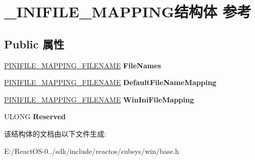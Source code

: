 \hypertarget{struct___i_n_i_f_i_l_e___m_a_p_p_i_n_g}{}\section{\+\_\+\+I\+N\+I\+F\+I\+L\+E\+\_\+\+M\+A\+P\+P\+I\+N\+G结构体 参考}
\label{struct___i_n_i_f_i_l_e___m_a_p_p_i_n_g}
\subsection*{Public 属性}
\begin{DoxyCompactItemize}
\item 
\mbox{\label{struct___i_n_i_f_i_l_e___m_a_p_p_i_n_g_a164a8a2c4169fd108c1e3c3f79a61966}} 
\hyperlink{struct___i_n_i_f_i_l_e___m_a_p_p_i_n_g___f_i_l_e_n_a_m_e}{P\+I\+N\+I\+F\+I\+L\+E\+\_\+\+M\+A\+P\+P\+I\+N\+G\+\_\+\+F\+I\+L\+E\+N\+A\+ME} {\bfseries File\+Names}
\item 
\mbox{\label{struct___i_n_i_f_i_l_e___m_a_p_p_i_n_g_a0376646b81cd1eaca2c4239abed9a4db}} 
\hyperlink{struct___i_n_i_f_i_l_e___m_a_p_p_i_n_g___f_i_l_e_n_a_m_e}{P\+I\+N\+I\+F\+I\+L\+E\+\_\+\+M\+A\+P\+P\+I\+N\+G\+\_\+\+F\+I\+L\+E\+N\+A\+ME} {\bfseries Default\+File\+Name\+Mapping}
\item 
\mbox{\label{struct___i_n_i_f_i_l_e___m_a_p_p_i_n_g_a0f9414d2678c2d238be805d43a09a63e}} 
\hyperlink{struct___i_n_i_f_i_l_e___m_a_p_p_i_n_g___f_i_l_e_n_a_m_e}{P\+I\+N\+I\+F\+I\+L\+E\+\_\+\+M\+A\+P\+P\+I\+N\+G\+\_\+\+F\+I\+L\+E\+N\+A\+ME} {\bfseries Win\+Ini\+File\+Mapping}
\item 
\mbox{\label{struct___i_n_i_f_i_l_e___m_a_p_p_i_n_g_af4d1f13d70530ce3eb50714e982cd718}} 
U\+L\+O\+NG {\bfseries Reserved}
\end{DoxyCompactItemize}


该结构体的文档由以下文件生成\+:\begin{DoxyCompactItemize}
\item 
E\+:/\+React\+O\+S-\/0../sdk/include/reactos/subsys/win/base.\+h\end{DoxyCompactItemize}
